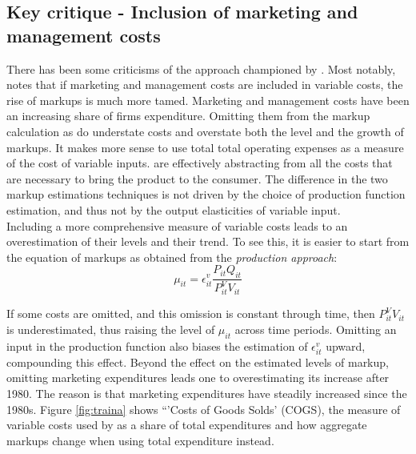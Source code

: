 \documentclass{amsart}
\theoremstyle{definition}
\theoremstyle{remark}
\numberwithin{equation}{section}
\begin{document}
\subsection*{Key critique - Inclusion of marketing and management costs} There has been some criticisms of the approach championed by \cite{de2019rise}. Most notably, \cite{traina2018aggregate} notes that if marketing and management costs are included in variable costs, the rise of markups is much more tamed. Marketing and management costs have been an increasing share of firms expenditure. Omitting them from the markup calculation as \cite{de2019rise} do understate costs and overstate both the level and the growth of markups. It makes more sense to use total total operating expenses as a measure of the cost of variable inputs. \cite{de2019rise} are effectively abstracting from all the costs that are necessary to bring the product to the consumer. The difference in the two markup estimations techniques is not driven by the choice of production function estimation, and thus not by the output elasticities of variable input. \\

Including a more comprehensive measure of variable costs leads to an overestimation of their levels and their trend. To see this, it is easier to start from the equation of markups as obtained from the \textit{production approach}:
$$\mu_{i t}=\epsilon_{i t}^v \frac{P_{i t} Q_{i t}}{P_{i t}^{V} V_{i t}}$$

If some costs are omitted, and this omission is constant through time, then $P_{i t}^{V} V_{i t}$ is underestimated, thus raising the level of $\mu_{i t}$ across time periods. Omitting an input in the production function also biases the estimation of $\epsilon_{i t}^v$ upward, compounding this effect. Beyond the effect on the estimated levels of markup, omitting marketing expenditures leads one to overestimating  its increase after 1980. The reason is that marketing expenditures have steadily increased since the 1980s. Figure \ref{fig:traina} shows ``'Costs of Goods Solds' (COGS), the measure of variable costs used by \cite{de2019rise} as a share of total expenditures and how aggregate markups change when using total expenditure instead.\\ 
\end{document}
